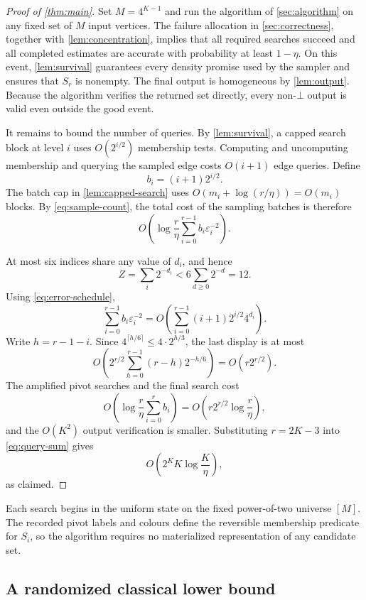 \begin{proof}[Proof of \cref{thm:main}]
Set $M=4^{K-1}$ and run the algorithm of \cref{sec:algorithm} on any fixed
set of $M$ input vertices.  The failure allocation in \cref{sec:correctness},
together with \cref{lem:concentration}, implies that all required searches
succeed and all completed estimates are accurate with probability at least
$1-\eta$.  On this event, \cref{lem:survival} guarantees every density
promise used by the sampler and ensures that $S_r$ is nonempty.  The final
output is homogeneous by \cref{lem:output}.  Because the algorithm verifies
the returned set directly, every non-$\bot$ output is valid even outside the
good event.

It remains to bound the number of queries.  By \cref{lem:survival}, a capped
search block at level $i$ uses $O(2^{i/2})$ membership tests.  Computing and
uncomputing membership and querying the sampled edge costs $O(i+1)$ edge
queries.  Define
\[
 b_i=(i+1)2^{i/2}.
\]
The batch cap in \cref{lem:capped-search} uses
$O(m_i+\log(r/\eta))=O(m_i)$ blocks.  By \cref{eq:sample-count}, the total
cost of the sampling batches is therefore
\begin{equation}\label{eq:query-sum}
 O\!\left(
 \log\frac r\eta
 \sum_{i=0}^{r-1}b_i\varepsilon_i^{-2}
 \right).
\end{equation}

At most six indices share any value of $d_i$, and hence
\[
 Z=\sum_i2^{-d_i}<6\sum_{d\ge0}2^{-d}=12.
\]
Using \cref{eq:error-schedule},
\[
 \sum_{i=0}^{r-1}b_i\varepsilon_i^{-2}
 =O\!\left(
 \sum_{i=0}^{r-1}(i+1)2^{i/2}4^{d_i}
 \right).
\]
Write $h=r-1-i$.  Since
$4^{\lceil h/6\rceil}\le4\cdot2^{h/3}$, the last display is at most
\[
 O\!\left(
 2^{r/2}\sum_{h=0}^{r-1}(r-h)2^{-h/6}
 \right)
 =O(r2^{r/2}).
\]
The amplified pivot searches and the final search cost
\[
 O\!\left(\log\frac r\eta\sum_{i=0}^{r}b_i\right)
 =O\!\left(r2^{r/2}\log\frac r\eta\right),
\]
and the $O(K^2)$ output verification is smaller.  Substituting $r=2K-3$
into \cref{eq:query-sum} gives
\[
 O\!\left(2^K K\log\frac K\eta\right),
\]
as claimed.
\end{proof}

Each search begins in the uniform state on the fixed power-of-two universe
$[M]$.  The recorded pivot labels and colours define the reversible membership
predicate for $S_i$, so the algorithm requires no materialized representation
of any candidate set.

\subsection{A randomized classical lower bound}
\label{sec:classical-lower}

